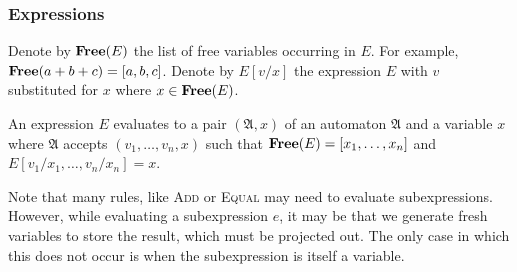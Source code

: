 \subsubsection{Expressions}

Denote by $\textbf{Free}(E)$ the list of free variables occurring in $E$.
For example, $\textbf{Free}(a + b + c) = [a, b, c]$.
Denote by $E[v/x]$ the expression $E$ with $v$ substituted for $x$ where $x \in \textbf{Free}(E)$.

An expression $E$ evaluates to a pair $(\mathfrak{A}, x)$ of an automaton $\mathfrak{A}$ and a variable $x$ where $\mathfrak{A}$ accepts $(v_1, \ldots, v_n, x)$ such that $\textbf{Free}(E) = [x_1, \ldots, x_n]$ and $E[v_1/x_1, \ldots, v_n/x_n] = x$.

Note that many rules, like \textsc{Add} or \textsc{Equal} may need to evaluate subexpressions.
However, while evaluating a subexpression $e$, it may be that we generate fresh variables to store the result, which must be projected out.
The only case in which this does not occur is when the subexpression is itself a variable.

